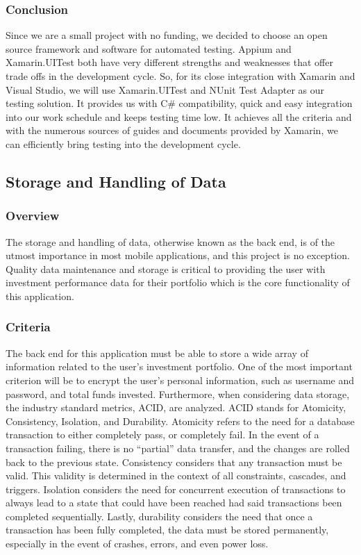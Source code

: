 \documentclass[onecolumn, draftclsnofoot,10pt, compsoc]{IEEEtran}
\begin{document}
\subsubsection{Conclusion}
Since we are a small project with no funding, we decided to choose an open source framework and software for automated testing. Appium and Xamarin.UITest both have very different strengths and weaknesses that offer
trade offs in the development cycle. So, for its close integration with Xamarin and Visual Studio, we will use Xamarin.UITest and NUnit Test Adapter as our testing solution. It provides us with C\# compatibility, 
quick and easy integration into our work schedule and keeps testing time low. It achieves all the criteria and with the numerous  sources of  guides and documents provided by Xamarin, we can efficiently bring testing
into the development cycle.

\subsection{Storage and Handling of Data}

\subsubsection{Overview}
The storage and handling of data, otherwise known as the back end, is of the utmost importance in most mobile applications, and this project is no exception. Quality data maintenance and storage is critical to providing the user with investment performance data for their portfolio which is the core functionality of this application.

\subsubsection{Criteria}
The back end for this application must be able to store a wide array of information related to the user's investment portfolio. One of the most important criterion will be to encrypt the user's personal information, such as username and password, and total funds invested. Furthermore, when considering data storage, the industry standard metrics, ACID, are analyzed. ACID stands for Atomicity, Consistency, Isolation, and Durability. Atomicity refers to the need for a database transaction to either completely pass, or completely fail. In the event of a transaction failing, there is no “partial” data transfer, and the changes are rolled back to the previous state. Consistency considers that any transaction must be valid. This validity is determined in the context of all constraints, cascades, and triggers. Isolation considers the need for concurrent execution of transactions to always lead to a state that could have been reached had said transactions been completed sequentially.  Lastly, durability considers the need that once a transaction has been fully completed, the data must be stored permanently, especially in the event of crashes, errors, and even power loss.
\end{document}
